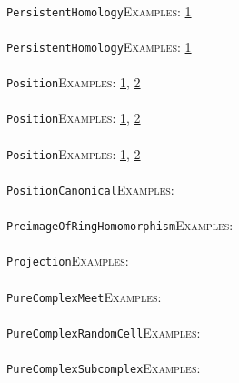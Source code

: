 \documentclass[a4paper,11pt]{report}
\begin{document}
{{ \\
 \texttt{PersistentHomology}{\nobreakspace}{\nobreakspace}{\nobreakspace}{\nobreakspace}\textsc{Examples:} \href{../www/SideLinks/About/aboutPersistent.html} {1}{\nobreakspace} \\
 \\
 \texttt{PersistentHomology}{\nobreakspace}{\nobreakspace}{\nobreakspace}{\nobreakspace}\textsc{Examples:} \href{../www/SideLinks/About/aboutPersistent.html} {1}{\nobreakspace} \\
 \\
 \texttt{Position}{\nobreakspace}{\nobreakspace}{\nobreakspace}{\nobreakspace}\textsc{Examples:} \href{tutorial/chap4.html} {1}{\nobreakspace}, \href{../www/SideLinks/About/aboutTensorSquare.html} {2}{\nobreakspace} \\
 \\
 \texttt{Position}{\nobreakspace}{\nobreakspace}{\nobreakspace}{\nobreakspace}\textsc{Examples:} \href{tutorial/chap4.html} {1}{\nobreakspace}, \href{../www/SideLinks/About/aboutTensorSquare.html} {2}{\nobreakspace} \\
 \\
 \texttt{Position}{\nobreakspace}{\nobreakspace}{\nobreakspace}{\nobreakspace}\textsc{Examples:} \href{tutorial/chap4.html} {1}{\nobreakspace}, \href{../www/SideLinks/About/aboutTensorSquare.html} {2}{\nobreakspace} \\
 \\
 \texttt{PositionCanonical}{\nobreakspace}{\nobreakspace}{\nobreakspace}{\nobreakspace}\textsc{Examples:} \\
 \\
 \texttt{PreimageOfRingHomomorphism}{\nobreakspace}{\nobreakspace}{\nobreakspace}{\nobreakspace}\textsc{Examples:} \\
 \\
 \texttt{Projection}{\nobreakspace}{\nobreakspace}{\nobreakspace}{\nobreakspace}\textsc{Examples:} \\
 \\
 \texttt{PureComplexMeet}{\nobreakspace}{\nobreakspace}{\nobreakspace}{\nobreakspace}\textsc{Examples:} \\
 \\
 \texttt{PureComplexRandomCell}{\nobreakspace}{\nobreakspace}{\nobreakspace}{\nobreakspace}\textsc{Examples:} \\
 \\
 \texttt{PureComplexSubcomplex}{\nobreakspace}{\nobreakspace}{\nobreakspace}{\nobreakspace}\textsc{Examples:} \\
}}
\end{document}
